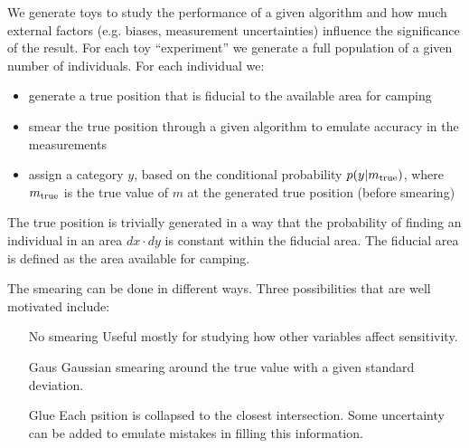 \documentclass{article}
\begin{document}
We generate toys to study the performance of a given algorithm and how much external factors (e.g. biases, measurement uncertainties)
influence the significance of the result. 
For each toy ``experiment'' we generate a full population of a given number of individuals.
For each individual we:
\begin{itemize}
\item generate a true position that is fiducial to the available area for camping
\item smear the true position through a given algorithm to emulate accuracy in the measurements
\item assign a category $y$, based on the conditional probability $p(y | m_{\rm true})$, where $m_{\rm true}$ is the true value of $m$ at the generated true position (before smearing)
\end{itemize}

The true position is trivially generated in a way that the probability of finding an individual in an area $dx\cdot dy$ is constant within the fiducial area.
The fiducial area is defined as the area available for camping.

The smearing can be done in different ways. Three possibilities that are well motivated include:
\begin{itemize}
\item[No smearing] Useful mostly for studying how other variables affect sensitivity.
\item[Gaus] Gaussian smearing around the true value with a given standard deviation.
\item[Glue] Each psition is collapsed to the closest intersection. Some uncertainty can be added to emulate mistakes in filling this information.
\end{itemize}
\end{document}
